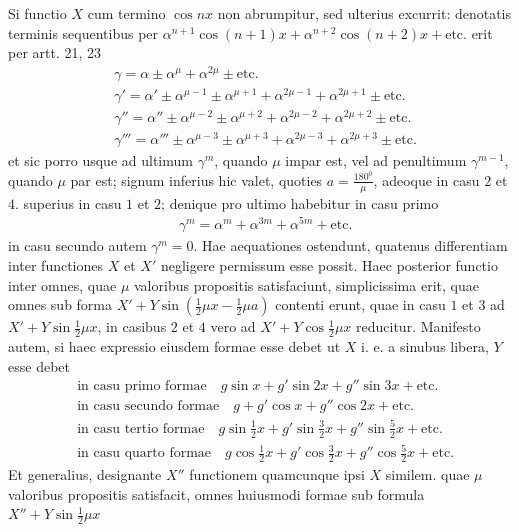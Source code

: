 Si functio $X$ cum termino $\cos nx$ non abrumpitur, sed ulterius excurrit:
denotatis terminis sequentibus per $\alpha^{n+1}\cos(n+1)x+\alpha^{n+2}\cos(n+2)x+\mathrm{etc.}$ erit
per artt. 21, 23
\[
\begin{aligned}
&\gamma = \alpha\pm\alpha^{\mu}+\alpha^{2\mu}\pm\mathrm{etc.}\\[5pt]
&\gamma' = \alpha'\pm\alpha^{\mu-1}\pm\alpha^{\mu+1}+\alpha^{2\mu-1}+\alpha^{2\mu+1}\pm\mathrm{etc.}\\[5pt]
&\gamma'' = \alpha''\pm\alpha^{\mu-2}\pm\alpha^{\mu+2}+\alpha^{2\mu-2}+\alpha^{2\mu+2}\pm\mathrm{etc.}\\[5pt]
&\gamma''' = \alpha'''\pm\alpha^{\mu-3}\pm\alpha^{\mu+3}+\alpha^{2\mu-3}+\alpha^{2\mu+3}\pm\mathrm{etc.}
\end{aligned}
\]
et sic porro usque ad ultimum $\gamma^m$, quando $\mu$ impar est, vel ad penultimum
$\gamma^{m-1}$, quando $\mu$ par est; signum inferius hic valet, quoties $a=\frac{180^{{\mathord{0}}}}{\mu}$, adeoque
in casu $2$ et $4$. superius in casu $1$ et $2$; denique pro ultimo habebitur in casu
primo
\[
\begin{aligned}
&\gamma^m=\alpha^m+\alpha^{3m}+\alpha^{5m}+\mathrm{etc.}
\end{aligned}
\]
in casu secundo autem $\gamma^m=0$. Hae aequationes ostendunt, quatenus differentiam inter functiones $X$ et $X'$ negligere permissum esse possit. Haec posterior
functio inter omnes, quae $\mu$ valoribus propositis satisfaciunt, simplicissima erit,
quae omnes sub forma $X'+Y\sin(\frac12\mu x-\frac12\mu a)$ contenti erunt, quae in casu
$1$ et $3$ ad $X'+Y\sin\frac12\mu x$, in casibus $2$ et $4$ vero ad $X'+Y\cos\frac12\mu x$ reducitur.
Manifesto autem, si haec expressio eiusdem formae esse debet ut $X$ i. e. a sinubus libera, $Y$ esse debet
\[
\begin{aligned}
&\text{in casu primo formae} \quad  g\sin x+g'\sin 2x+g''\sin 3x+\mathrm{etc.}\\[5pt]
&\text{in casu secundo formae} \quad  g+g'\cos x+g''\cos 2x+\mathrm{etc.}\\[5pt]
&\text{in casu tertio formae} \quad  g\sin\frac12 x+g'\sin\frac32 x+g''\sin\frac52 x+\mathrm{etc.}\\[5pt]
&\text{in casu quarto formae} \quad  g\cos\frac12 x+g'\cos\frac32 x+g''\cos\frac52 x+\mathrm{etc.}
\end{aligned}
\]
Et generalius, designante $X''$ functionem quamcunque ipsi $X$ similem. quae $\mu$ valoribus propositis satisfacit, omnes huiusmodi formae sub formula $X''+Y\sin\frac12\mu x$
